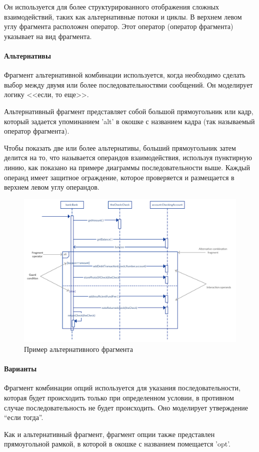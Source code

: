 \documentclass[a4paper,12pt]{report}
\begin{document}
Он используется для более структурированного отображения сложных взаимодействий, таких как альтернативные потоки и циклы. В верхнем левом углу фрагмента расположен оператор. Этот оператор (оператор фрагмента) указывает на вид фрагмента.
\paragraph{Альтернативы}

Фрагмент альтернативной комбинации используется, когда необходимо сделать выбор между двумя или более последовательностями сообщений. Он моделирует логику <<если, то еще>>.

Альтернативный фрагмент представляет собой большой прямоугольник или кадр, который задается упоминанием 'alt' в окошке с названием кадра (так называемый оператор фрагмента).

Чтобы показать две или более альтернативы, больший прямоугольник затем делится на то, что называется операндов взаимодействия, используя пунктирную линию, как показано на примере диаграммы последовательности выше. Каждый операнд имеет защитное ограждение, которое проверяется и размещается в верхнем левом углу операндов.

\begin{figure}[h!]
	\centering
	\includegraphics[width=0.5\linewidth]{images/framealt}
	\caption{Пример альтернативного фрагмента}
	\label{fig:framealt}
\end{figure}


\paragraph{Варианты}

Фрагмент комбинации опций используется для указания последовательности, которая будет происходить только при определенном условии, в противном случае последовательность не будет происходить. Оно моделирует утверждение “если тогда”.

Как и альтернативный фрагмент, фрагмент опции также представлен прямоугольной рамкой, в которой в окошке с названием помещается 'opt'.
\end{document}
